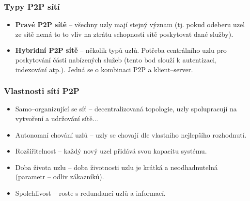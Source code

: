 \documentclass[11pt,a4paper]{article}
\begin{document}
\subsubsection{Typy P2P sítí}
\begin{itemize}
\item \textbf{Pravé P2P sítě} -- všechny uzly mají stejný význam (tj. pokud odeberu uzel ze sítě nemá to to vliv na ztrátu schopnosti sítě poskytovat dané služby).
\item \textbf{Hybridní P2P sítě} -- několik typů uzlů. Potřeba centrálního uzlu pro poskytování části nabízených služeb (tento bod slouží k autentizaci, indexování atp.). Jedná se o kombinaci P2P a klient--server.
\end{itemize}

\subsubsection{Vlastnosti sítí P2P}
\begin{itemize}
\item Samo--organizující se síť -- decentralizovaná topologie, uzly spolupracují na vytvoření a udržování sítě$\ldots$
\item Autonomní chování uzlů -- uzly se chovají dle vlastního nejlepšího rozhodnutí.
\item Rozšiřitelnost -- každý nový uzel přidává svou kapacitu systému.
\item Doba života uzlu --  doba životnosti uzlu je krátká a neodhadnutelná (parametr  -- odliv zákazníků).
\item Spolehlivost -- roste s redundancí uzlů a informací.
\end{itemize}
\end{document}
